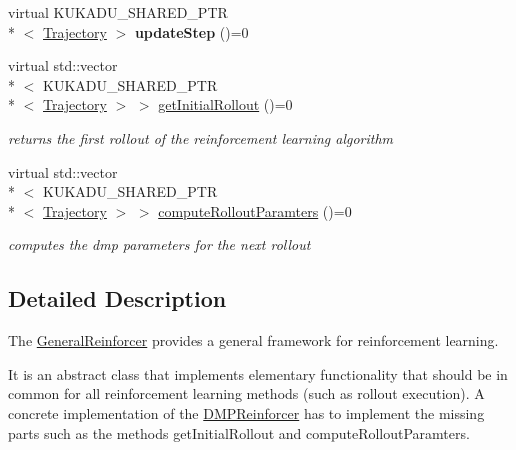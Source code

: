 \begin{DoxyCompactItemize}
\item 
\hypertarget{classkukadu_1_1GeneralReinforcer_a2925052d641e845dba068fa03d567b20}{virtual K\-U\-K\-A\-D\-U\-\_\-\-S\-H\-A\-R\-E\-D\-\_\-\-P\-T\-R\\*
$<$ \hyperlink{classkukadu_1_1Trajectory}{Trajectory} $>$ {\bfseries update\-Step} ()=0}\label{classkukadu_1_1GeneralReinforcer_a2925052d641e845dba068fa03d567b20}

\item 
\hypertarget{classkukadu_1_1GeneralReinforcer_aa7e72994ca8c009d1331129480d2e49f}{virtual std\-::vector\\*
$<$ K\-U\-K\-A\-D\-U\-\_\-\-S\-H\-A\-R\-E\-D\-\_\-\-P\-T\-R\\*
$<$ \hyperlink{classkukadu_1_1Trajectory}{Trajectory} $>$ $>$ \hyperlink{classkukadu_1_1GeneralReinforcer_aa7e72994ca8c009d1331129480d2e49f}{get\-Initial\-Rollout} ()=0}\label{classkukadu_1_1GeneralReinforcer_aa7e72994ca8c009d1331129480d2e49f}

\begin{DoxyCompactList}\small\item\em returns the first rollout of the reinforcement learning algorithm \end{DoxyCompactList}\item 
\hypertarget{classkukadu_1_1GeneralReinforcer_aec3cde390852d93c52a01926bbc6feb3}{virtual std\-::vector\\*
$<$ K\-U\-K\-A\-D\-U\-\_\-\-S\-H\-A\-R\-E\-D\-\_\-\-P\-T\-R\\*
$<$ \hyperlink{classkukadu_1_1Trajectory}{Trajectory} $>$ $>$ \hyperlink{classkukadu_1_1GeneralReinforcer_aec3cde390852d93c52a01926bbc6feb3}{compute\-Rollout\-Paramters} ()=0}\label{classkukadu_1_1GeneralReinforcer_aec3cde390852d93c52a01926bbc6feb3}

\begin{DoxyCompactList}\small\item\em computes the dmp parameters for the next rollout \end{DoxyCompactList}\end{DoxyCompactItemize}


\subsection{Detailed Description}
The \hyperlink{classkukadu_1_1GeneralReinforcer}{General\-Reinforcer} provides a general framework for reinforcement learning. 

It is an abstract class that implements elementary functionality that should be in common for all reinforcement learning methods (such as rollout execution). A concrete implementation of the \hyperlink{classkukadu_1_1DMPReinforcer}{D\-M\-P\-Reinforcer} has to implement the missing parts such as the methods get\-Initial\-Rollout and compute\-Rollout\-Paramters. 

